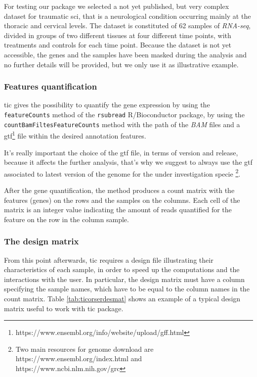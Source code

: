 For testing our package we selected a not yet published, but very complex dataset for traumatic \gls{sci}, that is a neurological condition occurring mainly at the thoracic and cervical levels.
The dataset is constituted of 62 samples of \textit{RNA-seq}, divided in groups of two different tissues at four different time points, with treatments and controls for each time point.
Because the dataset is not yet accessible, the genes and the samples have been masked during the analysis and no further details will be provided, but we only use it as illustrative example.

\subsubsection{Features quantification}
\gls{tic} gives the possibility to quantify the gene expression by using the \lstinline!featureCounts! method of the \lstinline!rsubread! R/Bioconductor package, by using the \lstinline!countBamFiltesFeatureCounts! method with the path of the \textit{BAM} files and a \gls{gtf}\footnote{https://www.ensembl.org/info/website/upload/gff.html} file within the desired annotation features.

It's really important the choice of the \gls{gtf} file, in terms of version and release, because it affects the further analysis, that's why we suggest to always use the \gls{gtf} associated to latest version of the genome for the under investigation specie \footnote{Two main resources for genome download are https://www.ensembl.org/index.html and https://www.ncbi.nlm.nih.gov/grc}. 

After the gene quantification, the method produces a count matrix with the features (genes) on the rows and the samples on the columns. 
Each cell of the matrix is an integer value indicating the amount of reads quantified for the feature on the row in the column sample. 

\subsubsection{The design matrix}
From this point afterwards, \gls{tic} requires a design file illustrating their characteristics of each sample, in order to speed up the computations and the interactions with the user.
In particular, the design matrix must have a column specifying the sample names, which have to be equal to the column names in the count matrix.
Table \ref{tab:ticorserdesmat} shows an example of a typical design matrix useful to work with \gls{tic} package.

